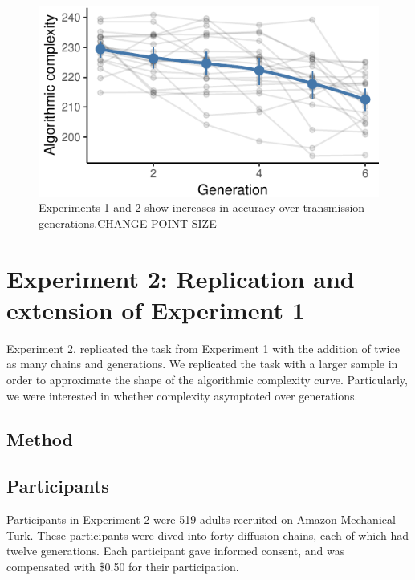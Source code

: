 \documentclass[10pt, letterpaper]{article}
\newenvironment{CodeChunk}{}{}
\begin{document}
\begin{CodeChunk}
\begin{figure}[tb]

{\centering \includegraphics{figs/e1_bdm_plot-1} 

}

\caption[Experiments 1 and 2 show increases in accuracy over transmission generations.CHANGE POINT SIZE]{Experiments 1 and 2 show increases in accuracy over transmission generations.CHANGE POINT SIZE}\label{fig:e1_bdm_plot}
\end{figure}
\end{CodeChunk}

\section{Experiment 2: Replication and extension of Experiment
1}\label{experiment-2-replication-and-extension-of-experiment-1}

Experiment 2, replicated the task from Experiment 1 with the addition of
twice as many chains and generations. We replicated the task with a
larger sample in order to approximate the shape of the algorithmic
complexity curve. Particularly, we were interested in whether complexity
asymptoted over generations.

\subsection{Method}\label{method-1}

\subsection{Participants}\label{participants-1}

Participants in Experiment 2 were 519 adults recruited on Amazon
Mechanical Turk. These participants were dived into forty diffusion
chains, each of which had twelve generations. Each participant gave
informed consent, and was compensated with \$0.50 for their
participation.
\end{document}
